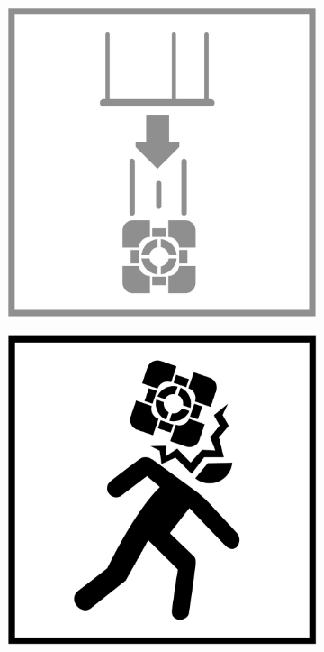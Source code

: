 \begin{figure}[H]
  \begin{subfigure}[l]{0.195\linewidth}
    \includegraphics[width=\textwidth]{Sources/PortalIcons/d1.jpg}
  \end{subfigure}
  \begin{subfigure}[l]{0.195\linewidth}
    \includegraphics[width=\textwidth]{Sources/PortalIcons/2.jpg}

\end{subfigure}
\end{figure}
